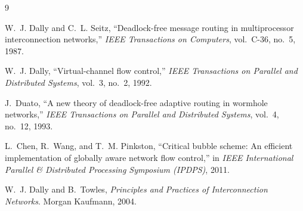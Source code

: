 \documentclass[10pt]{article}
\begin{document}
\begin{thebibliography}{9}

W.~J. Dally and C.~L. Seitz,
``Deadlock-free message routing in multiprocessor interconnection
networks,''
\emph{IEEE Transactions on Computers}, vol.~C-36, no.~5, 1987.

W.~J. Dally,
``Virtual-channel flow control,''
\emph{IEEE Transactions on Parallel and Distributed Systems}, vol.~3,
no.~2, 1992.

J.~Duato,
``A new theory of deadlock-free adaptive routing in wormhole networks,''
\emph{IEEE Transactions on Parallel and Distributed Systems}, vol.~4,
no.~12, 1993.

L.~Chen, R.~Wang, and T.~M. Pinkston,
``Critical bubble scheme: An efficient implementation of globally aware
network flow control,''
in \emph{IEEE International Parallel \& Distributed Processing Symposium
(IPDPS)}, 2011.

W.~J. Dally and B.~Towles,
\emph{Principles and Practices of Interconnection Networks}.
Morgan Kaufmann, 2004.

\end{thebibliography}
\end{document}
